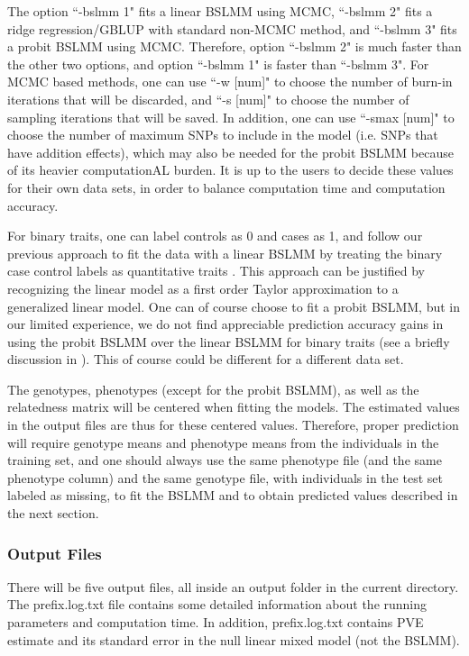 \documentclass[11pt]{article}
\begin{document}
The option ``-bslmm 1" fits a linear BSLMM using MCMC, ``-bslmm 2" fits a ridge regression/GBLUP with standard non-MCMC method, and ``-bslmm 3" fits a probit BSLMM using MCMC. Therefore, option ``-bslmm 2" is much faster than the other two options, and option ``-bslmm 1" is faster than ``-bslmm 3". For MCMC based methods, one can use ``-w [num]" to choose the number of burn-in iterations that will be discarded, and ``-s [num]" to choose the number of sampling iterations that will be saved. In addition, one can use ``-smax [num]" to choose the number of maximum SNPs to include in the model (i.e. SNPs that have addition effects), which may also be needed for the probit BSLMM because of its heavier computationAL burden. It is up to the users to decide these values for their own data sets, in order to balance computation time and computation accuracy. 

For binary traits, one can label controls as 0 and cases as 1, and follow our previous approach to fit the data with a linear BSLMM by treating the binary case control labels as quantitative traits \cite{Zhou:2013}. This approach can be justified by recognizing the linear model as a first order Taylor approximation to a generalized linear model. One can of course choose to fit a probit BSLMM, but in our limited experience, we do not find appreciable prediction accuracy gains in using the probit BSLMM over the linear BSLMM for binary traits (see a briefly discussion in \cite{Zhou:2013}). This of course could be different for a different data set.

The genotypes, phenotypes (except for the probit BSLMM), as well as the relatedness matrix will be centered when fitting the models. The estimated values in the output files are thus for these centered values. Therefore, proper prediction will require genotype means and phenotype means from the individuals in the training set, and one should always use the same phenotype file (and the same phenotype column) and the same genotype file, with individuals in the test set labeled as missing, to fit the BSLMM and to obtain predicted values described in the next section. 



\subsubsection{Output Files}
There will be five output files, all inside an output folder in the current directory. The prefix.log.txt file contains some detailed information about the running parameters and computation time. In addition, prefix.log.txt contains PVE estimate and its standard error in the null linear mixed model (not the BSLMM).
\end{document}
